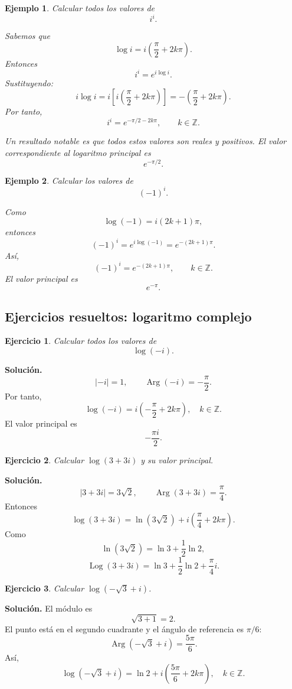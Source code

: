 \documentclass[12pt]{article}
\newtheorem{Ejem}{Ejemplo}
\DeclareMathOperator{\Arg}{Arg}
\DeclareMathOperator{\Log}{Log}
\newtheorem{ejercicio}{Ejercicio}[section]
\begin{document}
\begin{Ejem}
Calcular todos los valores de
\[
i^i.
\]

Sabemos que
\[
\log i=i\left(\frac{\pi}{2}+2k\pi\right).
\]
Entonces
\[
i^i=e^{i\log i}.
\]
Sustituyendo:
\[
i\log i
=
i\left[
i\left(\frac{\pi}{2}+2k\pi\right)
\right]
=
-\left(\frac{\pi}{2}+2k\pi\right).
\]
Por tanto,
\[
\boxed{
i^i=e^{-\pi/2-2k\pi},
\qquad k\in\mathbb Z.
}
\]

Un resultado notable es que \emph{todos estos valores son reales y positivos}.
El valor correspondiente al logaritmo principal es
\[
\boxed{
e^{-\pi/2}.
}
\]
\end{Ejem}

\begin{Ejem}
Calcular los valores de
\[
(-1)^i.
\]

Como
\[
\log(-1)=i(2k+1)\pi,
\]
entonces
\[
(-1)^i
=
e^{i\log(-1)}
=
e^{-(2k+1)\pi}.
\]
Así,
\[
\boxed{
(-1)^i=e^{-(2k+1)\pi},
\qquad k\in\mathbb Z.
}
\]
El valor principal es
\[
\boxed{e^{-\pi}.}
\]
\end{Ejem}
\subsection*{Ejercicios resueltos: logaritmo complejo}
\begin{ejercicio}
Calcular todos los valores de
\[
\log(-i).
\]
\end{ejercicio}

\textbf{Solución.}
\[
|-i|=1,\qquad
\operatorname{Arg}(-i)=-\frac{\pi}{2}.
\]
Por tanto,
\[
\boxed{
\log(-i)
=
i\left(-\frac{\pi}{2}+2k\pi\right),
\quad k\in\mathbb Z.
}
\]
El valor principal es
\[
\boxed{-\frac{\pi i}{2}.}
\]

\begin{ejercicio}
Calcular $\log(3+3i)$ y su valor principal.
\end{ejercicio}

\textbf{Solución.}
\[
|3+3i|=3\sqrt2,\qquad
\Arg(3+3i)=\frac{\pi}{4}.
\]
Entonces
\[
\boxed{
\log(3+3i)
=
\ln(3\sqrt2)
+i\left(\frac{\pi}{4}+2k\pi\right).
}
\]
Como
\[
\ln(3\sqrt2)=\ln3+\frac12\ln2,
\]
\[
\boxed{
\Log(3+3i)
=
\ln3+\frac12\ln2+\frac{\pi}{4}i.
}
\]

\begin{ejercicio}
Calcular $\log(-\sqrt3+i)$.
\end{ejercicio}

\textbf{Solución.}
El módulo es
\[
\sqrt{3+1}=2.
\]
El punto está en el segundo cuadrante y el ángulo de referencia es $\pi/6$:
\[
\Arg(-\sqrt3+i)=\frac{5\pi}{6}.
\]
Así,
\[
\boxed{
\log(-\sqrt3+i)
=
\ln2+i\left(\frac{5\pi}{6}+2k\pi\right),
\quad k\in\mathbb Z.
}
\]
\end{document}
